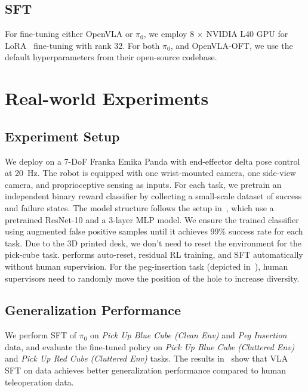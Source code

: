 \subsection{SFT}
For fine-tuning either OpenVLA or $\pi_0$, we employ 8 $\times$ NVIDIA L40 GPU for LoRA~\citep{hu2021loralowrankadaptationlarge} fine-tuning with rank 32. For both $\pi_0$, and OpenVLA-OFT, we use the default hyperparameters from their open-source codebase.

\section{Real-world Experiments}
\label{sec:appendix-real-world-exp}

\subsection{Experiment Setup}
\label{sec:real-world-setup}
We deploy \method on a 7-DoF Franka Emika Panda with end-effector delta pose control at 20~Hz. The robot is equipped with one wrist-mounted camera, one side-view camera, and proprioceptive sensing as inputs. For each task, we pretrain an independent binary reward classifier by collecting a small-scale dataset of success and failure states. The model structure follows the setup in~\citep{luo2025hilserl}, which use a pretrained ResNet-10 and a 3-layer MLP model. We ensure the trained classifier using augmented false positive samples until it achieves 99\% success rate for each task. Due to the 3D printed desk, we don't need to reset the environment for the pick-cube task. \method performs auto-reset, residual RL training, and SFT automatically without human supervision. For the peg-insertion task (depicted in~), human supervisors need to randomly move the position of the hole to increase diversity.

\subsection{Generalization Performance}
\label{sec: generalization}
We perform SFT of $\pi_0$ on \textit{Pick Up Blue Cube (Clean Env)} and \textit{Peg Insertion} data, and evaluate the fine-tuned policy on \textit{Pick Up Blue Cube (Cluttered Env)} and \textit{Pick Up Red Cube (Cluttered Env)} tasks. The results in~ show that VLA SFT on \method data achieves better generalization performance compared to human teleoperation data.

